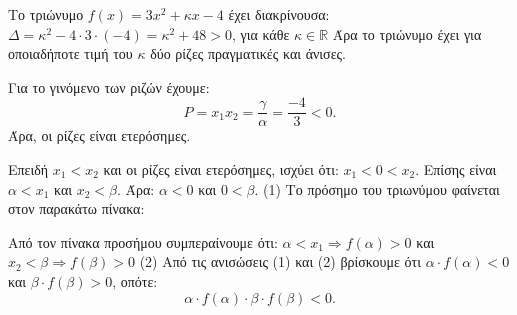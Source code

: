 
\begin{alist}
\item Το τριώνυμο $f(x) = 3x^2 + \kappa x - 4$ έχει διακρίνουσα:
$\Delta = \kappa^2 - 4 \cdot 3 \cdot (-4) = \kappa^2 + 48 > 0$, για κάθε $\kappa \in \mathbb{R}$
Άρα το τριώνυμο έχει για οποιαδήποτε τιμή του $\kappa$ δύο ρίζες πραγματικές και άνισες.

\item Για το γινόμενο των ριζών έχουμε:
\[P = x_1 x_2 = \dfrac{\gamma}{\alpha} = \dfrac{-4}{3} < 0.\]
Άρα, οι ρίζες είναι ετερόσημες.

\item Επειδή $x_1 < x_2$ και οι ρίζες είναι ετερόσημες, ισχύει ότι:
$x_1 < 0 < x_2$.
Επίσης είναι $\alpha < x_1$ και $x_2 < \beta$. Άρα:
$\alpha < 0$ και $0 < \beta$. (1)
Το πρόσημο του τριωνύμου φαίνεται στον παρακάτω πίνακα:

\begin{center}
\end{center}

Από τον πίνακα προσήμου συμπεραίνουμε ότι:
$\alpha < x_1 \Rightarrow f(\alpha) > 0$ και $x_2 < \beta \Rightarrow f(\beta) > 0$ (2)
Από τις ανισώσεις (1) και (2) βρίσκουμε ότι $\alpha \cdot f(\alpha) < 0$ και $\beta \cdot f(\beta) > 0$, οπότε:
\[\alpha \cdot f(\alpha) \cdot \beta \cdot f(\beta) < 0.\]
\end{alist}

